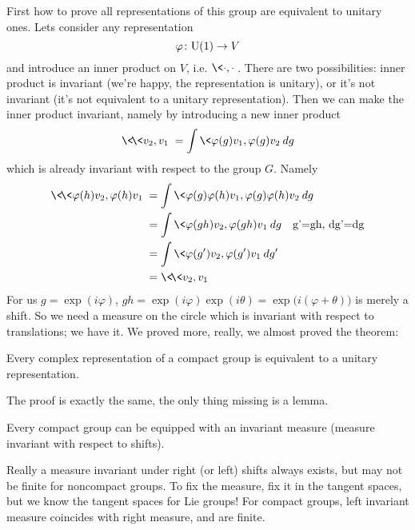 First how to prove all representations of this group are
equivalent to unitary ones. Lets consider any representation
\begin{equation}
\varphi\colon {\rm U}(1)\to V
\end{equation}
and introduce an inner product on $V$,
i.e. $\<\cdot,\cdot\>$. There are two possibilities: inner
product is invariant (we're happy, the representation is
unitary), or it's not invariant (it's not equivalent to a unitary
representation). Then we can make the inner product invariant,
namely by introducing a new inner product
\begin{equation}
\<\!\< v_{2},v_{1}\>\!\> = \int \<\varphi(g)v_{1},\varphi(g)v_{2}\>dg
\end{equation}
which is already invariant with respect to the group $G$. Namely
\begin{subequations}
\begin{align}
\<\!\<\varphi(h) v_{2},\varphi(h)v_{1}\>\!\> &= \int \<\varphi(g)\varphi(h)v_{1},\varphi(g)\varphi(h)v_{2}\>dg\\
&=\int\<\varphi(gh)v_{2},\varphi(gh)v_{1}\>dg\quad\mbox{g'=gh,
  dg'=dg}\\
&=\int\<\varphi(g')v_{2},\varphi(g')v_{1}\>dg'\\
&=\<\!\<v_{2},v_{1}\>\!\>
\end{align}
\end{subequations}
For us $g=\exp(i\varphi)$,
$gh=\exp(i\varphi)\exp(i\theta)=\exp\big(i(\varphi+\theta)\big)$
is merely a shift. So we need a measure on the circle which is
invariant with respect to translations; we have it. We proved
more, really, we almost proved the theorem:
\begin{thm}
Every complex representation of a compact group is equivalent to a
unitary representation.
\end{thm}
The proof is exactly the same, the only thing missing is a lemma.
\begin{lem}
Every compact group can be equipped with an invariant measure
(measure invariant with respect to shifts).
\end{lem}
Really a measure invariant under right (or left) shifts always
exists, but may not be finite for noncompact groups. To fix the
measure, fix it in the tangent spaces, but we know the tangent
spaces for Lie groups! For compact groups, left invariant measure
coincides with right measure, and are finite.
